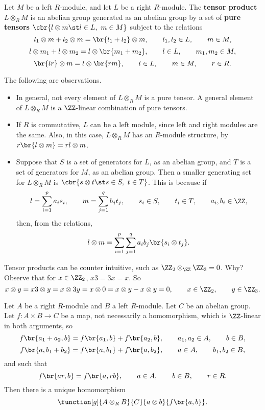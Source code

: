\begin{definition}
Let $ M $ be a left $ R $-module, and let $ L $ be a right $ R $-module. The \textbf{tensor product} $ L \otimes_R M $ is an abelian group generated as an abelian group by a set of \textbf{pure tensors} $ \cbr{l \otimes m \st l \in L, \ m \in M} $ subject to the relations
$$ l_1 \otimes m + l_2 \otimes m = \br{l_1 + l_2} \otimes m, \qquad l_1, l_2 \in L, \qquad m \in M, $$
$$ l \otimes m_1 + l \otimes m_2 = l \otimes \br{m_1 + m_2}, \qquad l \in L, \qquad m_1, m_2 \in M, $$
$$ \br{lr} \otimes m = l \otimes \br{rm}, \qquad l \in L, \qquad m \in M, \qquad r \in R. $$
\end{definition}

The following are observations.
\begin{itemize}
\item In general, not every element of $ L \otimes_R M $ is a pure tensor. A general element of $ L \otimes_R M $ is a $ \ZZ $-linear combination of pure tensors.
\item If $ R $ is commutative, $ L $ can be a left module, since left and right modules are the same. Also, in this case, $ L \otimes_R M $ has an $ R $-module structure, by $ r\br{l \otimes m} = rl \otimes m $.
\item Suppose that $ S $ is a set of generators for $ L $, as an abelian group, and $ T $ is a set of generators for $ M $, as an abelian group. Then a smaller generating set for $ L \otimes_R M $ is $ \cbr{s \otimes t \st s \in S, \ t \in T} $. This is because if
$$ l = \sum_{i = 1}^p a_is_i, \qquad m = \sum_{j = 1}^q b_jt_j, \qquad s_i \in S, \qquad t_i \in T, \qquad a_i, b_i \in \ZZ, $$
then, from the relations,
$$ l \otimes m = \sum_{i = 1}^p \sum_{j = 1}^q a_ib_j\br{s_i \otimes t_j}. $$
\end{itemize}

\pagebreak

\begin{example*}
Tensor products can be counter intuitive, such as $ \ZZ_2 \otimes_\ZZ \ZZ_3 = 0 $. Why? Observe that for $ x \in \ZZ_2 $, $ x3 = 3x = x $. So
$$ x \otimes y = x3 \otimes y = x \otimes 3y = x \otimes 0 = x \otimes y - x \otimes y = 0, \qquad x \in \ZZ_2, \qquad y \in \ZZ_3. $$
\end{example*}


\begin{theorem}
Let $ A $ be a right $ R $-module and $ B $ a left $ R $-module. Let $ C $ be an abelian group. Let $ f : A \times B \to C $ be a map, not necessarily a homomorphism, which is $ \ZZ $-linear in both arguments, so
$$ f\br{a_1 + a_2, b} = f\br{a_1, b} + f\br{a_2, b}, \qquad a_1, a_2 \in A, \qquad b \in B, $$
$$ f\br{a, b_1 + b_2} = f\br{a, b_1} + f\br{a, b_2}, \qquad a \in A, \qquad b_1, b_2 \in B, $$
and such that
$$ f\br{ar, b} = f\br{a, rb}, \qquad a \in A, \qquad b \in B, \qquad r \in R. $$
Then there is a unique homomorphism
$$ \function[g]{A \otimes_R B}{C}{a \otimes b}{f\br{a, b}}. $$
\end{theorem}

